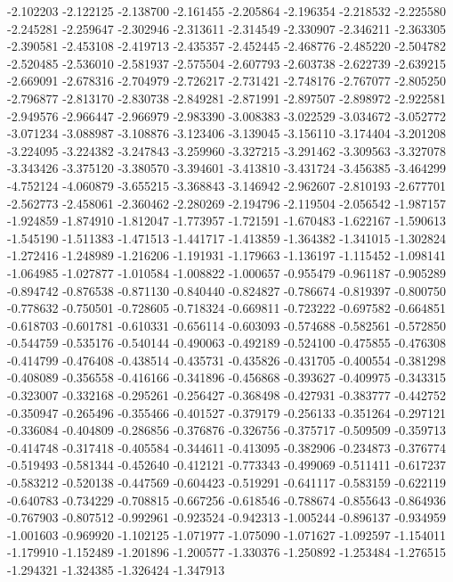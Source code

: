-2.102203
-2.122125
-2.138700
-2.161455
-2.205864
-2.196354
-2.218532
-2.225580
-2.245281
-2.259647
-2.302946
-2.313611
-2.314549
-2.330907
-2.346211
-2.363305
-2.390581
-2.453108
-2.419713
-2.435357
-2.452445
-2.468776
-2.485220
-2.504782
-2.520485
-2.536010
-2.581937
-2.575504
-2.607793
-2.603738
-2.622739
-2.639215
-2.669091
-2.678316
-2.704979
-2.726217
-2.731421
-2.748176
-2.767077
-2.805250
-2.796877
-2.813170
-2.830738
-2.849281
-2.871991
-2.897507
-2.898972
-2.922581
-2.949576
-2.966447
-2.966979
-2.983390
-3.008383
-3.022529
-3.034672
-3.052772
-3.071234
-3.088987
-3.108876
-3.123406
-3.139045
-3.156110
-3.174404
-3.201208
-3.224095
-3.224382
-3.247843
-3.259960
-3.327215
-3.291462
-3.309563
-3.327078
-3.343426
-3.375120
-3.380570
-3.394601
-3.413810
-3.431724
-3.456385
-3.464299
-4.752124
-4.060879
-3.655215
-3.368843
-3.146942
-2.962607
-2.810193
-2.677701
-2.562773
-2.458061
-2.360462
-2.280269
-2.194796
-2.119504
-2.056542
-1.987157
-1.924859
-1.874910
-1.812047
-1.773957
-1.721591
-1.670483
-1.622167
-1.590613
-1.545190
-1.511383
-1.471513
-1.441717
-1.413859
-1.364382
-1.341015
-1.302824
-1.272416
-1.248989
-1.216206
-1.191931
-1.179663
-1.136197
-1.115452
-1.098141
-1.064985
-1.027877
-1.010584
-1.008822
-1.000657
-0.955479
-0.961187
-0.905289
-0.894742
-0.876538
-0.871130
-0.840440
-0.824827
-0.786674
-0.819397
-0.800750
-0.778632
-0.750501
-0.728605
-0.718324
-0.669811
-0.723222
-0.697582
-0.664851
-0.618703
-0.601781
-0.610331
-0.656114
-0.603093
-0.574688
-0.582561
-0.572850
-0.544759
-0.535176
-0.540144
-0.490063
-0.492189
-0.524100
-0.475855
-0.476308
-0.414799
-0.476408
-0.438514
-0.435731
-0.435826
-0.431705
-0.400554
-0.381298
-0.408089
-0.356558
-0.416166
-0.341896
-0.456868
-0.393627
-0.409975
-0.343315
-0.323007
-0.332168
-0.295261
-0.256427
-0.368498
-0.427931
-0.383777
-0.442752
-0.350947
-0.265496
-0.355466
-0.401527
-0.379179
-0.256133
-0.351264
-0.297121
-0.336084
-0.404809
-0.286856
-0.376876
-0.326756
-0.375717
-0.509509
-0.359713
-0.414748
-0.317418
-0.405584
-0.344611
-0.413095
-0.382906
-0.234873
-0.376774
-0.519493
-0.581344
-0.452640
-0.412121
-0.773343
-0.499069
-0.511411
-0.617237
-0.583212
-0.520138
-0.447569
-0.604423
-0.519291
-0.641117
-0.583159
-0.622119
-0.640783
-0.734229
-0.708815
-0.667256
-0.618546
-0.788674
-0.855643
-0.864936
-0.767903
-0.807512
-0.992961
-0.923524
-0.942313
-1.005244
-0.896137
-0.934959
-1.001603
-0.969920
-1.102125
-1.071977
-1.075090
-1.071627
-1.092597
-1.154011
-1.179910
-1.152489
-1.201896
-1.200577
-1.330376
-1.250892
-1.253484
-1.276515
-1.294321
-1.324385
-1.326424
-1.347913
